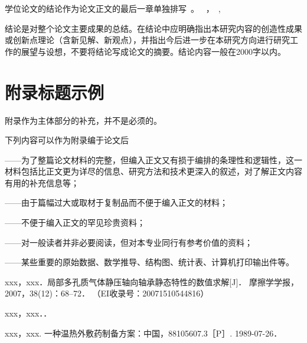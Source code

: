 \documentclass[a4paper, twoside, openany]{NCEPUMaster}
\begin{document}
学位论文的结论作为论文正文的最后一章单独排写~。
~，~, ~

结论是对整个论文主要成果的总结。在结论中应明确指出本研究内容的创造性成果或创新点理论（含新见解、新观点），并指出今后进一步在本研究方向进行研究工作的展望与设想，不要将结论写成论文的摘要。结论内容一般在2000字以内。




  \appendix\chapter{附录标题示例}

附录作为主体部分的补充，并不是必须的。

下列内容可以作为附录编于论文后

——为了整篇论文材料的完整，但编入正文又有损于编排的条理性和逻辑性，这一材料包括比正文更为详尽的信息、研究方法和技术更深入的叙述，对了解正文内容有用的补充信息等；

——由于篇幅过大或取材于复制品而不便于编入正文的材料；

——不便于编入正文的罕见珍贵资料；

——对一般读者并非必要阅读，但对本专业同行有参考价值的资料；

——某些重要的原始数据、数学推导、结构图、统计表、计算机打印输出件等。  \stopappendix
{}


\begin{achievementlist}
\item[ {[1]} ]
xxx，xxx．局部多孔质气体静压轴向轴承静态特性的数值求解[J]．
摩擦学学报，2007，38(12)：68--72．
（EI收录号：20071510544816）
\item[ {[2]} ]
xxx，xxx．．
\end{achievementlist}


\begin{achievementlist}
\item[ {[1]} ]
xxx，xxx. 一种温热外敷药制备方案：中国，88105607.3［P］. 1989-07-26．
\end{achievementlist}
\end{document}
